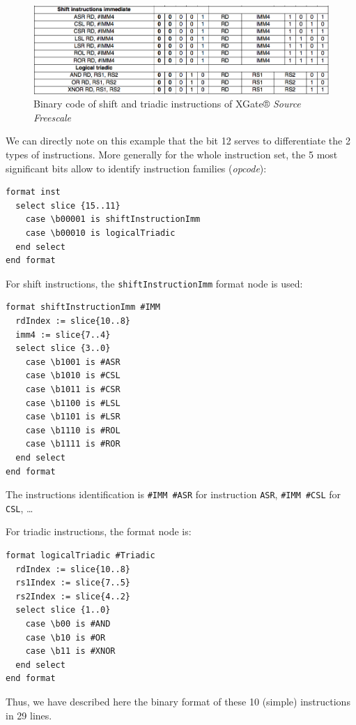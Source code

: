 \begin{figure}[h]		%
  \begin{center}
    \includegraphics[width=0.95 \linewidth]{../common/images/shiftAndTriadicInstFormat.png}
    \caption{Binary code of shift and triadic instructions of XGate® \emph{Source Freescale}}
    \label{fig:shiftAndTriadicInstFormat}
  \end{center}
\end{figure}

We can directly note on this example that the bit 12 serves to differentiate the 2 types of instructions. More generally for the whole instruction set, the 5 most significant bits allow to identify instruction families (\emph{opcode}):
\begin{lstlisting}
format inst
  select slice {15..11}
    case \b00001 is shiftInstructionImm
    case \b00010 is logicalTriadic
  end select
end format
\end{lstlisting}
For shift instructions, the \texttt{shiftInstructionImm} format node is used:
\begin{lstlisting}[firstnumber=7]
format shiftInstructionImm #IMM
  rdIndex := slice{10..8}
  imm4 := slice{7..4}
  select slice {3..0}
    case \b1001 is #ASR
    case \b1010 is #CSL
    case \b1011 is #CSR
    case \b1100 is #LSL
    case \b1101 is #LSR
    case \b1110 is #ROL
    case \b1111 is #ROR
  end select
end format
\end{lstlisting}
The instructions identification is \texttt{\#IMM \#ASR} for instruction \texttt{ASR}, \texttt{\#IMM \#CSL} for \texttt{CSL}, \ldots

For triadic instructions, the format node is:
\begin{lstlisting}[firstnumber=20]
format logicalTriadic #Triadic
  rdIndex := slice{10..8}
  rs1Index := slice{7..5}
  rs2Index := slice{4..2}
  select slice {1..0}
    case \b00 is #AND
    case \b10 is #OR
    case \b11 is #XNOR
  end select
end format
\end{lstlisting}
Thus, we have described here the binary format of these 10 (simple) instructions in 29 lines.

